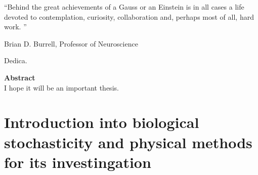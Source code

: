 \documentclass[12pt,a4paper]{report}
\begin{document}
\newpage
\thispagestyle{empty}
\mbox{}
\newpage





\thispagestyle{empty} %
 \epigraph{``Behind the great achievements of a Gauss or an Einstein is in all cases a life devoted to contemplation, curiosity, collaboration and, perhaps most of all, hard work.
''\footnotemark}{Brian D. Burrell, Professor of Neuroscience}




\newpage
\thispagestyle{empty}
\mbox{}
\newpage

\thispagestyle{empty}
\begin{flushright}
 Dedica.
\end{flushright}

\newpage
\thispagestyle{empty}
\mbox{}
\newpage


\begin{flushleft}
{\LARGE{\bf Abstract}}\\
\vspace{9mm}
I hope it will be an important thesis.
\end{flushleft}
\thispagestyle{empty}
\clearpage
{}

\newpage

\tableofcontents

\newpage



\part{Introduction into biological stochasticity and physical methods for its investingation}
\end{document}
